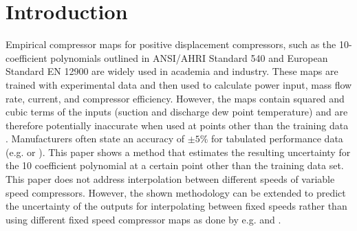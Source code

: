 \section{Introduction}
\label{sec:introduction}
Empirical compressor maps for positive displacement compressors, such as the 10-coefficient polynomials outlined in ANSI/AHRI Standard 540 \cite{AHRI:540} and European Standard EN 12900 \cite{CEN:2013}  are widely used in academia and industry.  These maps are trained with experimental data and then used to calculate power input, mass flow rate, current, and compressor efficiency.  However, the maps contain squared and cubic terms of the inputs (suction and discharge dew point temperature) and are therefore potentially inaccurate when used at points other than the training data . Manufacturers often state an accuracy of $\pm 5 \%$ for tabulated performance data (e.g. \cite{emerson:2006} or \cite{bristol:2015}).
This paper shows a method that estimates the resulting uncertainty for the 10 coefficient polynomial at a certain point other than the training data set. \\
This paper does not address interpolation between different speeds of variable speed compressors. However, the shown methodology can be extended to predict the uncertainty of the outputs for interpolating between fixed speeds rather than using different fixed speed compressor maps as done by e.g.  \cite{shen:2014} and \cite{caskey:2012}.